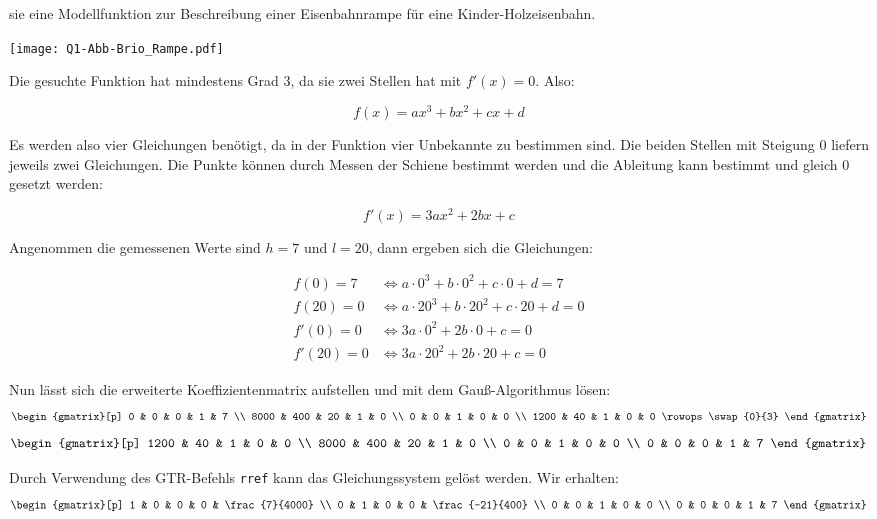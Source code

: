 \documentclass[11pt, a4paper, ngerman]{arbeitsblatt}
\begin{document}
\TITEL

\begin{aufgabe}
	 sie eine Modellfunktion zur Beschreibung einer Eisenbahnrampe für eine Kinder-Holzeisenbahn.

	\texttt{[image: Q1-Abb-Brio\_Rampe.pdf]}
\end{aufgabe}
\begin{loesung}
	Die gesuchte Funktion hat mindestens Grad 3, da sie zwei Stellen hat mit $f'(x) = 0$. Also:

	\[ f(x) = ax^3 + bx^2 + cx + d \]

	Es werden also vier Gleichungen benötigt, da in der Funktion vier Unbekannte zu bestimmen sind. Die beiden Stellen mit Steigung $0$ liefern jeweils zwei Gleichungen. Die Punkte können durch Messen der Schiene bestimmt werden und die Ableitung kann bestimmt und gleich $0$ gesetzt werden:

	\[ f'(x) = 3ax^2 + 2bx + c \]

	Angenommen die gemessenen Werte sind $h = 7$ und $l = 20$, dann ergeben sich die Gleichungen:

	\begin{align*}
		f(0) = 7 &\Leftrightarrow a\cdot 0^3 + b\cdot 0^2 + c\cdot 0 + d = 7 \\
		f(20) = 0 &\Leftrightarrow a\cdot 20^3 + b\cdot 20^2 + c\cdot 20 + d = 0 \\
		f'(0) = 0 &\Leftrightarrow 3a\cdot 0^2 + 2b\cdot 0 + c = 0 \\
		f'(20) = 0 &\Leftrightarrow 3a\cdot 20^2 + 2b\cdot 20 + c = 0
	\end{align*}

	Nun lässt sich die erweiterte Koeffizientenmatrix aufstellen und mit dem Gauß-Algorithmus lösen:
	\[ \begin{gmatrix}[p]
	0 & 0 & 0 & 1 & 7 \\
	8000 & 400 & 20 & 1 & 0 \\
	0 & 0 & 1 & 0 & 0 \\
	1200 & 40 & 1 & 0 & 0
	\rowops
	\swap{0}{3}
	\end{gmatrix} \]
	\[ \begin{gmatrix}[p]
	1200 & 40 & 1 & 0 & 0 \\
	8000 & 400 & 20 & 1 & 0 \\
	0 & 0 & 1 & 0 & 0 \\
	0 & 0 & 0 & 1 & 7
	\end{gmatrix} \]

	Durch Verwendung des GTR-Befehls \texttt{rref} kann das Gleichungssystem gelöst werden. Wir erhalten:
	\[ \begin{gmatrix}[p]
	1 & 0 & 0 & 0 & \frac{7}{4000} \\
	0 & 1 & 0 & 0 & \frac{-21}{400} \\
	0 & 0 & 1 & 0 & 0 \\
	0 & 0 & 0 & 1 & 7
	\end{gmatrix} \]


\end{loesung}
\end{document}
